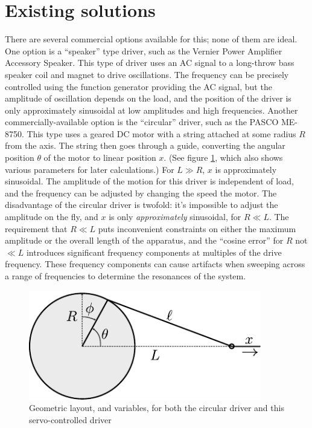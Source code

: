\documentclass[prb,preprint]{revtex4-1}
\begin{document}
\section{Existing solutions}
There are several commercial options available for this; none of them are ideal. 
One option is a ``speaker'' type driver, such as the Vernier Power Amplifier Accessory Speaker.\cite{VernierSpeaker}  
This type of driver uses an AC signal to a long-throw bass speaker coil and magnet to drive oscillations. 
The frequency can be precisely controlled using the function generator providing the AC signal, but the amplitude of oscillation depends on the load, and the position of the driver is only approximately sinusoidal at low amplitudes and high frequencies.
Another commercially-available option is the ``circular'' driver, such as the PASCO ME-8750.\cite{PascoMotor} 
This type uses a geared DC motor with a string attached at some radius $R$ from the axis. The string then goes through a guide, converting the angular position $\theta$ of the motor to linear position $x$. (See figure \ref{fig:circular}, which also shows various parameters for later calculations.) 
For $L\gg R$, $x$ is approximately sinusoidal. 
The amplitude of the motion for this driver is independent of load, and the frequency can be adjusted by changing the speed the motor.
The disadvantage of the circular driver is twofold: it's impossible to adjust the amplitude on the fly, and $x$ is only \emph{approximately} sinusoidal, for $R \ll L$.
The requirement that $R \ll L$ puts inconvenient constraints on either the maximum amplitude or the overall length of the apparatus, and the ``cosine error'' for $R$ not $\ll L$ introduces significant frequency components at multiples of the drive frequency. 
These frequency components can cause artifacts when sweeping across a range of frequencies to determine the resonances of the system.

\begin{figure}[ht]
	\begin{center}
		\includegraphics[width=4in]{geometry}
	\end{center}
	\caption{Geometric layout, and variables, for both the circular driver and this servo-controlled driver}
	\label{fig:circular}
\end{figure}
\end{document}
